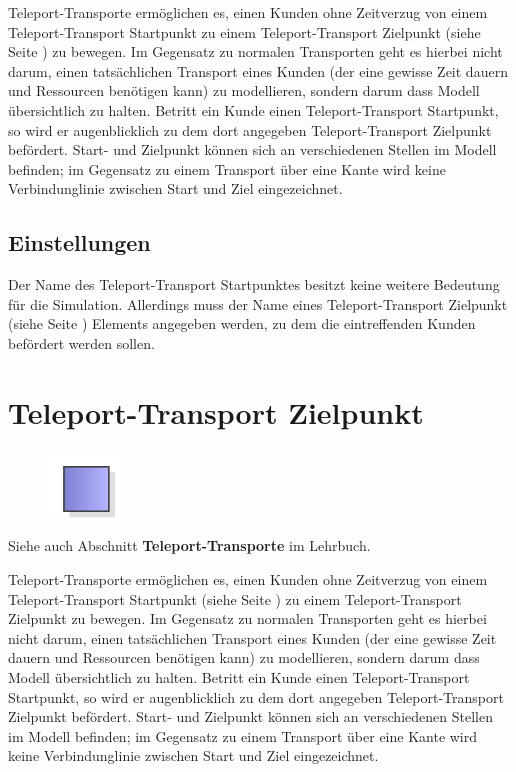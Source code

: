 Teleport-Transporte ermöglichen es, einen Kunden ohne Zeitverzug
von einem Teleport-Transport Startpunkt zu einem 
Teleport-Transport Zielpunkt (siehe Seite \pageref{ref:ModelElementTeleportDestination}) 
zu bewegen. Im Gegensatz zu normalen Transporten geht es hierbei nicht darum,
einen tatsächlichen Transport eines Kunden (der eine gewisse Zeit dauern und
Ressourcen benötigen kann) zu modellieren, sondern darum dass Modell übersichtlich
zu halten. Betritt ein Kunde einen Teleport-Transport Startpunkt, so wird er
augenblicklich zu dem dort angegeben Teleport-Transport Zielpunkt befördert.
Start- und Zielpunkt können sich an verschiedenen Stellen im Modell befinden;
im Gegensatz zu einem Transport über eine Kante wird keine Verbindunglinie
zwischen Start und Ziel eingezeichnet.

\subsection*{Einstellungen}

Der Name des Teleport-Transport Startpunktes besitzt keine weitere Bedeutung
für die Simulation. Allerdings muss der Name eines
Teleport-Transport Zielpunkt (siehe Seite \pageref{ref:ModelElementTeleportDestination}) 
Elements angegeben werden, zu dem die eintreffenden Kunden befördert werden sollen.


\section{Teleport-Transport Zielpunkt}
\label{ref:ModelElementTeleportDestination}

\begin{figure}
\vspace{-22pt}
\includegraphics[width=2cm]{imageModelElementTeleportDestination.png}
\vspace{-22pt}
\end{figure}

Siehe auch Abschnitt \textbf{Teleport-Transporte} im Lehrbuch.

Teleport-Transporte ermöglichen es, einen Kunden ohne Zeitverzug
von einem Teleport-Transport Startpunkt (siehe Seite \pageref{ref:ModelElementTeleportSource}) 
zu einem Teleport-Transport Zielpunkt zu bewegen. Im Gegensatz zu normalen
Transporten geht es hierbei nicht darum, einen tatsächlichen Transport eines Kunden
(der eine gewisse Zeit dauern und Ressourcen benötigen kann) zu modellieren,
sondern darum dass Modell übersichtlich zu halten. Betritt ein Kunde einen
Teleport-Transport Startpunkt, so wird er augenblicklich zu dem dort angegeben
Teleport-Transport Zielpunkt befördert.
Start- und Zielpunkt können sich an verschiedenen Stellen im Modell befinden;
im Gegensatz zu einem Transport über eine Kante wird keine Verbindunglinie
zwischen Start und Ziel eingezeichnet.

